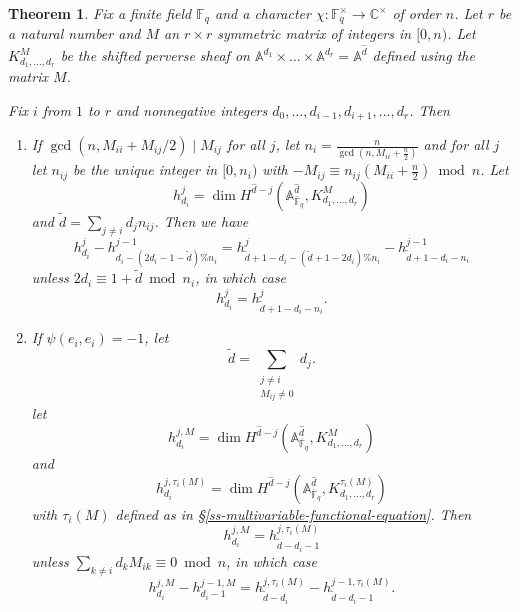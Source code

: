 \documentclass[11pt,letterpaper]{article}
\newtheorem{theorem}{Theorem}[section]
\theoremstyle{definition}
\theoremstyle{remark}
\numberwithin{equation}{section}
\theoremstyle{dotless}
\newcommand{\hchi}{\psi} %
\renewcommand{\tilde}{\widetilde}
\begin{document}
\begin{theorem}\label{homological-relation-theorem} Fix a finite field $\mathbb F_q$ and a character $\chi \colon \mathbb F_q^\times \to \mathbb C^\times$ of order $n$. Let $r$ be a natural number and $M$ an $r\times r$ symmetric matrix of integers in $[0,n)$.  Let $K_{d_1,\dots,d_r}^{M}$ be the shifted perverse sheaf on $\mathbb A^{d_1} \times \dots \times \mathbb A^{d_r} = \mathbb A^{\hat{d}}$ defined using the matrix $M$.

Fix $i$ from $1$ to $r$ and nonnegative integers $d_0,\dots, d_{i-1}, d_{i+1},\dots, d_r$.
Then
\begin{enumerate}
    \item If $\gcd(n, M_{ii} + M_{ij}/2)\mid M_{ij}$ for all $j$, let $n_i = \frac{n}{ \gcd(n, M_{ii} + \frac{n}{2})}$ and for all $j$ let $n_{ij}$ be the unique integer in $[0,n_i)$ with $-M_{ij} \equiv n_{ij} (M_{ii}+\frac{n}{2} ) \bmod n$. Let 
    \[ h^j_{d_i} = \dim H^{\hat{d}-j}(\mathbb A^{\hat{d}}_{\overline{\mathbb F}_q}, K^{M}_{d_1,\dots, d_r})\]  and $\tilde{d} =\sum_{j \neq i} d_j n_{ij}$.
    Then we have 
    \begin{equation}\label{hom-k-g-state} h^j_{d_i} - h^{j-1}_{d_i - (2d_i-1-\tilde{d})\%n_i} = h^{j}_{\tilde{d}+1-d_i - (\tilde{d}+1-2d_i)\% n_i} - h^{j-1}_{\tilde{d}+1-d_i-n_i} \end{equation}
    unless $2d_i \equiv 1 + \tilde{d}\bmod n_i$, in which case 
    \begin{equation}\label{hom-k-s-state} h^j_{d_i} = h^j_{\tilde{d}+1-d_i-n_i}.\end{equation}

    
    \item If $\hchi(e_i,e_i)=-1$, let \[ \tilde{d} = \sum_{\substack{j \neq i\\ M_{ij}\neq 0 }} d_j .\] let
    \[ h^{j,M}_{d_i} = \dim H^{\hat{d}-j}(\mathbb A^{\hat{d}}_{\overline{\mathbb F}_q}, K^{M}_{d_1,\dots, d_r})\] and
        \[ h^{j, \tau_i(M)}_{d_i}= \dim H^{\hat{d}-j}(\mathbb A^{\hat{d}}_{\overline{\mathbb F}_q}, K^{\tau_i(M)}_{d_1,\dots, d_r})\] with $\tau_i(M)$ defined as in \S\ref{ss-multivariable-functional-equation}.
Then
    \begin{equation}\label{hom-d-g-state} h^{j,M}_{d_i}= h^{j,\tau_i(M)}_{\tilde{d}-d_i-1} \end{equation} unless $\sum_{k\neq i} d_k M_{ik} \equiv 0 \bmod n$, in which case
\begin{equation}\label{hom-d-s-state} h^{j,M}_{d_i}- h^{j-1,M}_{d_i-1} = h^{j,\tau_i(M)}_{\tilde{d}-d_i} - h^{j-1,\tau_i(M)}_{\tilde{d}-d_i-1}  .\end{equation}
    
\end{enumerate}


\end{theorem}
\end{document}
